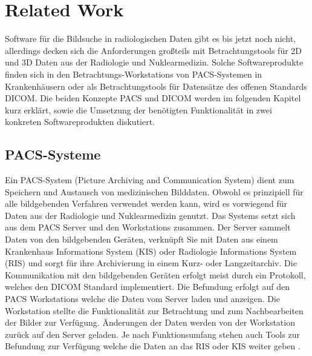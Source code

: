 
\section{Related Work}
\label{sec:relatedWork}
Software für die Bildsuche in radiologischen Daten gibt es bis jetzt noch nicht,  
allerdings decken sich die Anforderungen großteils mit Betrachtungstools für 2D und 3D Daten aus der Radiologie und Nuklearmedizin.
Solche Softwareprodukte finden sich in den Betrachtungs-Workstations von PACS-Systemen in Krankenhäusern oder als Betrachtungstools für Datensätze des offenen Standards DICOM.
Die beiden Konzepte PACS und DICOM werden im folgenden Kapitel kurz erklärt, sowie die Umsetzung der benötigten Funktionalität in zwei konkreten Softwareprodukten diskutiert.

\subsection{PACS-Systeme}
\label{sec:PACS-Systeme}
Ein PACS-System (Picture Archiving and Communication System) dient zum Speichern und Austausch von medizinischen Bilddaten.
Obwohl es prinzipiell für alle bildgebenden Verfahren verwendet werden kann,
wird es vorwiegend für Daten aus der Radiologie und Nuklearmedizin genutzt.
%
Das Systems setzt sich aus dem PACS Server und den Workstations zusammen.
Der Server sammelt Daten von den bildgebenden Geräten,
 verknüpft Sie mit Daten aus einem Krankenhaus Informations System (KIS) oder Radiologie Informations System (RIS) und sorgt für ihre Archivierung in einem Kurz- oder Langzeitarchiv. 
Die Kommunikation mit den bildgebenden Geräten erfolgt meist durch ein Protokoll, welches den DICOM Standard implementiert.
%
Die Befundung erfolgt auf den PACS Workstations welche die Daten vom Server laden und anzeigen.
Die Workstation stellte die Funktionalität zur Betrachtung und zum Nachbearbeiten der Bilder zur Verfügung.
Änderungen der Daten werden von der Workstation zurück auf den Server geladen.
Je nach Funktionsumfang stehen auch Tools zur Befundung zur Verfügung welche die Daten an das RIS oder KIS weiter geben \cite{pacs}.

